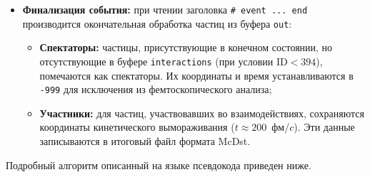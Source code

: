 \documentclass[a4paper]{extarticle}
\begin{document}
\begin{itemize}
                \item \textbf{Финализация события:} 
                    при чтении заголовка \texttt{\# event ... end} 
                    производится окончательная обработка частиц из буфера \texttt{out}:
                    \begin{itemize}
                        \item \textbf{Спектаторы:} 
                            частицы, присутствующие в конечном состоянии, 
                            но отсутствующие в буфере \texttt{interactions} 
                            (при условии $\text{ID} < 394$), помечаются как спектаторы. 
                            Их координаты и время устанавливаются в \texttt{-999} 
                            для исключения из фемтоскопического анализа;
                        \item \textbf{Участники:} 
                            для частиц, участвовавших во взаимодействиях, сохраняются 
                            координаты кинетического вымораживания ($t \approx 200$~фм/$c$). 
                            Эти данные записываются в итоговый файл формата McDst.
                    \end{itemize}
            \end{itemize}

            Подробный алгоритм описанный на языке псевдокода приведен ниже.
\end{document}

